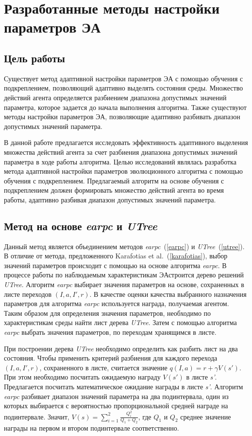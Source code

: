 \chapter{Разработанные методы настройки параметров ЭА}
\label{proposed_chapter}
\section{Цель работы}
Существует метод адаптивной настройки параметров ЭА с помощью обучения с подкреплением, позволяющий адаптивно выделять состояния среды. Множество действий агента определяется разбиением диапазона допустимых значений параметра, которое задается до начала выполнения алгоритма. Также существуют методы настройки параметров ЭА, позволяющие адаптивно разбивать диапазон допустимых значений параметра.

В данной работе предлагается исследовать эффективность адаптивного выделения множества действий агента за счет разбиения диапазона допустимых значений параметра в ходе работы алгоритма. Целью исследований являлась разработка метода адаптивной настройки параметров эволюционного алгоритма с помощью обучения с подкреплением. Предлагаемый алгоритм на основе обучения с подкреплением должен формировать множество действий агента во время работы, адаптивно разбивая диапазон допустимых значений параметра.

\section{Метод на основе \textit{earpc} и \textit{UTree}}
\label{composing_method}
Данный метод является объединением методов \textit{earpc}~(\ref{earpc}) и \textit{UTree}~(\ref{utree}). В отличие от метода, предложенного Karafotias et al.~(\ref{karafotias}), выбор значений параметров происходит с помощью на основе алгоритма \textit{earpc}. В процессе работы по наблюдаемым характеристикам ЭАстроится дерево решений \textit{UTree}. Алгоритм \textit{earpc} выбирает значения параметров на основе, сохраненных в листе переходов $(I, a, I', r)$. В качестве оценки качества выбранного назначения параметров для алгоритма \textit{earpc} используется награда, получаемая агентом. Таким образом для определения значения параметров, необходимо по характеристикам среды найти лист дерева \textit{UTree}. Затем с помощью алгоритма \textit{earpc} выбрать значения параметров, по переходам хранящимся в листе.

При построении дерева \textit{UTree} необходимо определить как разбить лист на два состояния. Чтобы применить критерий разбиения для каждого перехода $(I, a, I', r)$, сохраненного в листе, считается значение $q(I, a) = r + \gamma V(s')$. При этом необходимо посчитать ожидаемую награду $V(s')$ в листе \textit{s'}. Предлагается посчитать математическое ожидание награды в листе \textit{s'}. Алгоритм \textit{earpc} разбивает диапазон значений параметра на два подинтервала, один из которых выбирается с вероятностью пропорциональной средней награде на подинтервале. Значит, $V(s) = \sum\limits_{i = 1}^2{\frac{Q_i^2}{Q_1 + Q_2}}$, где $Q_1$ и $Q_2$ среднее значение награды на первом и втором подинтервале соответственно. 

